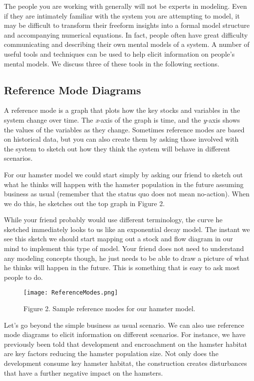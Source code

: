 \documentclass[]{memoir}
\let\Oldincludegraphics\includegraphics
\renewcommand{\includegraphics}[1]{\Oldincludegraphics[max size={\textwidth}{\textheight}]{#1}}
\begin{document}
The people you are working with generally will not be experts in
modeling. Even if they are intimately familiar with the system you are
attempting to model, it may be difficult to transform their freeform
insights into a formal model structure and accompanying numerical
equations. In fact, people often have great difficulty communicating and
describing their own mental models of a system. A number of useful tools
and techniques can be used to help elicit information on people's mental
models. We discuss three of these tools in the following sections.

\subsection{Reference Mode Diagrams}

A reference mode is a graph that plots how the key stocks and variables
in the system change over time. The \emph{x}-axis of the graph is time,
and the \emph{y}-axis shows the values of the variables as they change.
Sometimes reference modes are based on historical data, but you can also
create them by asking those involved with the system to sketch out how
they think the system will behave in different scenarios.

For our hamster model we could start simply by asking our friend to
sketch out what he thinks will happen with the hamster population in the
future assuming business as usual (remember that the status quo does not
mean no-action). When we do this, he sketches out the top graph in
Figure 2.

While your friend probably would use different terminology, the curve he
sketched immediately looks to us like an exponential decay model. The
instant we see this sketch we should start mapping out a stock and flow
diagram in our mind to implement this type of model. Your friend does
not need to understand any modeling concepts though, he just needs to be
able to draw a picture of what he thinks will happen in the future. This
is something that is easy to ask most people to do.

\begin{figure}[htbp]
\centering
\texttt{[image: ReferenceModes.png]}
\caption{Figure 2. Sample reference modes for our hamster model.}
\end{figure}

Let's go beyond the simple business as usual scenario. We can also use
reference mode diagrams to elicit information on different scenarios.
For instance, we have previously been told that development and
encroachment on the hamster habitat are key factors reducing the hamster
population size. Not only does the development consume key hamster
habitat, the construction creates disturbances that have a further
negative impact on the hamsters.
\end{document}
